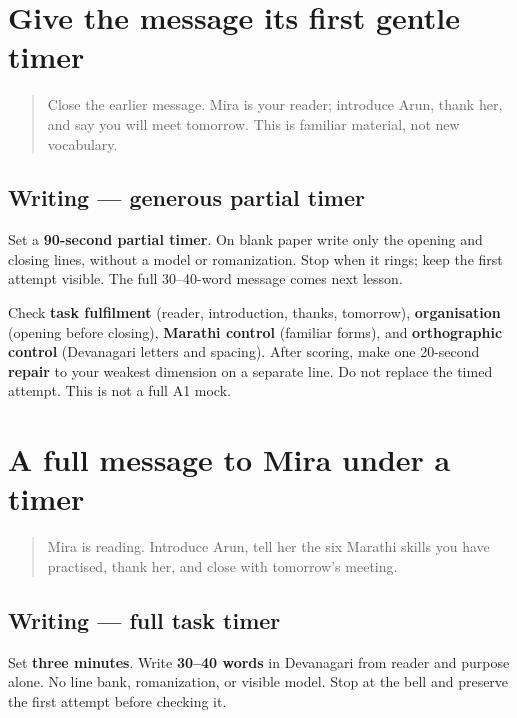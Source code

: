 \section[partial-timer named-reader message]{Give the message its first gentle timer}

\label{lesson:MR-A1M19-partial-timer}



\begin{quote}
Close the earlier message. Mira is your reader; introduce Arun, thank her, and say you will meet tomorrow. This is familiar material, not new vocabulary.
\end{quote}

\subsection*{Writing — generous partial timer}
Set a \textbf{90-second partial timer}. On blank paper write only the opening and closing lines, without a model or romanization. Stop when it rings; keep the first attempt visible. The full 30–40-word message comes next lesson.

\begin{tcolorbox}[breakable,colback=teal!4,colframe=teal!35!black,title={Before you move on}]
Check \textbf{task fulfilment} (reader, introduction, thanks, tomorrow), \textbf{organisation} (opening before closing), \textbf{Marathi control} (familiar forms), and \textbf{orthographic control} (Devanagari letters and spacing). After scoring, make one 20-second \textbf{repair} to your weakest dimension on a separate line. Do not replace the timed attempt. This is not a full A1 mock.
\end{tcolorbox}
\section[timed named-reader message]{A full message to Mira under a timer}

\label{lesson:MR-A1M20-timed-message}



\begin{quote}
Mira is reading. Introduce Arun, tell her the six Marathi skills you have practised, thank her, and close with tomorrow's meeting.
\end{quote}

\subsection*{Writing — full task timer}
Set \textbf{three minutes}. Write \textbf{30–40 words} in Devanagari from reader and purpose alone. No line bank, romanization, or visible model. Stop at the bell and preserve the first attempt before checking it.

